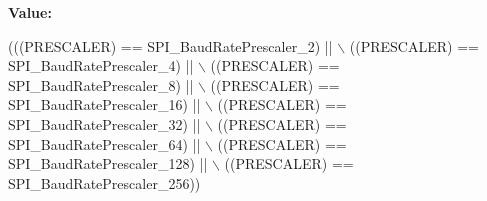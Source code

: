 {\bfseries Value\+:}
\begin{DoxyCode}
(((PRESCALER) == SPI\_BaudRatePrescaler\_2) || \(\backslash\)
                                              ((PRESCALER) == SPI\_BaudRatePrescaler\_4) || \(\backslash\)
                                              ((PRESCALER) == SPI\_BaudRatePrescaler\_8) || \(\backslash\)
                                              ((PRESCALER) == SPI\_BaudRatePrescaler\_16) || \(\backslash\)
                                              ((PRESCALER) == SPI\_BaudRatePrescaler\_32) || \(\backslash\)
                                              ((PRESCALER) == SPI\_BaudRatePrescaler\_64) || \(\backslash\)
                                              ((PRESCALER) == SPI\_BaudRatePrescaler\_128) || \(\backslash\)
                                              ((PRESCALER) == SPI\_BaudRatePrescaler\_256))
\end{DoxyCode}
